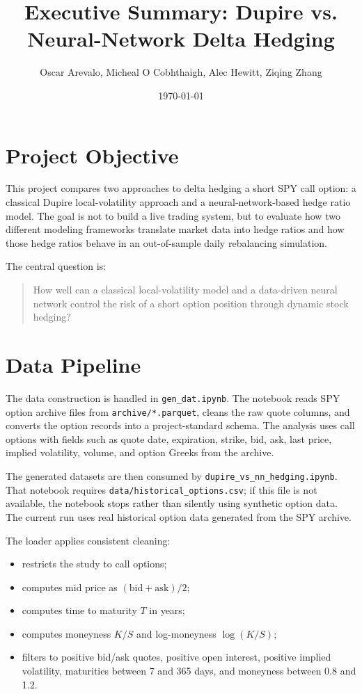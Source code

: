 \documentclass[11pt]{article}
\title{Executive Summary: Dupire vs. Neural-Network Delta Hedging}
\author{Oscar Arevalo, Micheal O Cobhthaigh, Alec Hewitt, Ziqing Zhang}
\date{\today}
\begin{document}
\maketitle

\section*{Project Objective}

This project compares two approaches to delta hedging a short SPY call option:
a classical Dupire local-volatility approach and a neural-network-based hedge
ratio model. The goal is not to build a live trading system, but to evaluate how
two different modeling frameworks translate market data into hedge ratios and
how those hedge ratios behave in an out-of-sample daily rebalancing simulation.

The central question is:
\begin{quote}
How well can a classical local-volatility model and a data-driven neural network
control the risk of a short option position through dynamic stock hedging?
\end{quote}

\section*{Data Pipeline}

The data construction is handled in \texttt{gen\_dat.ipynb}. The notebook reads
SPY option archive files from \texttt{archive/*.parquet}, cleans the raw quote
columns, and converts the option records into a project-standard schema. The
analysis uses call options with fields such as quote date, expiration, strike,
bid, ask, last price, implied volatility, volume, and option Greeks from the
archive.

The generated datasets are then consumed by \texttt{dupire\_vs\_nn\_hedging.ipynb}.
That notebook requires \texttt{data/historical\_options.csv}; if this file is not
available, the notebook stops rather than silently using synthetic option data.
The current run uses real historical option data generated from the SPY archive.

The loader applies consistent cleaning:
\begin{itemize}
    \item restricts the study to call options;
    \item computes mid price as $(\text{bid}+\text{ask})/2$;
    \item computes time to maturity $T$ in years;
    \item computes moneyness $K/S$ and log-moneyness $\log(K/S)$;
    \item filters to positive bid/ask quotes, positive open interest, positive
    implied volatility, maturities between 7 and 365 days, and moneyness between
    0.8 and 1.2.
\end{itemize}
\end{document}
